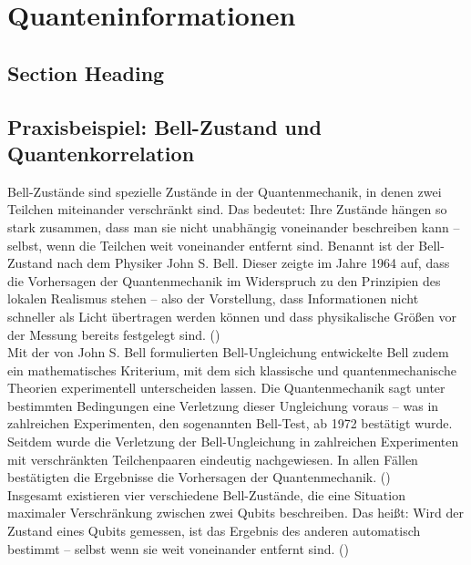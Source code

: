 \chapter{Quanteninformationen}
\label{qbits} %



\section{Section Heading}

\section{Praxisbeispiel: Bell-Zustand und Quantenkorrelation}
Bell-Zustände sind spezielle Zustände in der Quantenmechanik, in denen zwei Teilchen miteinander verschränkt sind. Das bedeutet: Ihre Zustände hängen so stark zusammen, dass man sie nicht unabhängig voneinander beschreiben kann – selbst, wenn die Teilchen weit voneinander entfernt sind. Benannt ist der Bell-Zustand nach dem Physiker John S. Bell. Dieser zeigte im Jahre 1964 auf, dass die Vorhersagen der Quantenmechanik im Widerspruch zu den Prinzipien des lokalen Realismus stehen – also der Vorstellung, dass Informationen nicht schneller als Licht übertragen werden können und dass physikalische Größen vor der Messung bereits festgelegt sind. (\cite[S.195]{bell_einstein_1964})
\\


Mit der von John S. Bell formulierten Bell-Ungleichung entwickelte Bell zudem ein mathematisches Kriterium, mit dem sich klassische und quantenmechanische Theorien experimentell unterscheiden lassen. Die Quantenmechanik sagt unter bestimmten Bedingungen eine Verletzung dieser Ungleichung voraus – was in zahlreichen Experimenten, den sogenannten Bell-Test, ab 1972 bestätigt wurde. Seitdem wurde die Verletzung der Bell-Ungleichung in zahlreichen Experimenten mit verschränkten Teilchenpaaren eindeutig nachgewiesen. In allen Fällen bestätigten die Ergebnisse die Vorhersagen der Quantenmechanik. 
(\cite[S.53-59]{homeister_quantum_2022})
\\


Insgesamt existieren vier verschiedene Bell-Zustände, die eine Situation maximaler Verschränkung zwischen zwei Qubits beschreiben. Das heißt: Wird der Zustand eines Qubits gemessen, ist das Ergebnis des anderen automatisch bestimmt – selbst wenn sie weit voneinander entfernt sind. (\cite[S.53-55]{homeister_quantum_2022}) 
\\


